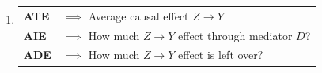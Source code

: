 \documentclass[dvipsnames,handout]{beamer} %
\begin{document}
\begin{frame}[noframenumbering]
\begin{enumerate}
\begin{figure}
        \end{figure}
        \item
        \begin{tabular}{ll}
            \textbf{ATE} & $\implies$ Average causal effect $Z \to Y$ \\
            \textbf{AIE} & $\implies$ How much $Z \to Y$ effect through mediator $D$? \\
            \textbf{ADE} & $\implies$ How much $Z \to Y$ effect is left over?
        \end{tabular}
    \end{enumerate}
\end{frame}%
\end{document}

